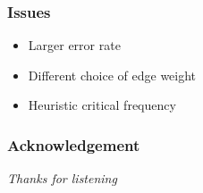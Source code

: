 \documentclass{beamer}
\begin{document}
\begin{frame}
\frametitle{Issues}
\begin{itemize}
\item Larger error rate\\\quad
\item Different choice of edge weight\\\quad
\item Heuristic critical frequency
\end{itemize}
\end{frame}
\begin{frame}
\frametitle{Acknowledgement}
\begin{center}
\itshape\Huge Thanks for listening
\end{center}
\end{frame}
\end{document}
